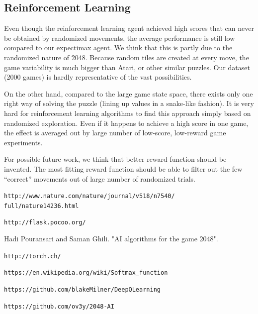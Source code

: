 \documentclass[9pt,twocolumn]{article}
\begin{document}
\subsection{Reinforcement Learning}

Even though the reinforcement learning agent achieved high scores that can never be obtained by randomized movements, the average performance is still low compared to our expectimax agent. We think that this is partly due to the randomized nature of 2048. Because random tiles are created at every move, the game variability is much bigger than Atari, or other similar puzzles. Our dataset (2000 games) is hardly representative of the vast possibilities.

On the other hand, compared to the large game state space, there exists only one right way of solving the puzzle (lining up values in a snake-like fashion). It is very hard for reinforcement learning algorithms to find this approach simply based on randomized exploration. Even if it happens to achieve a high score in one game, the effect is averaged out by large number of low-score, low-reward game experiments.

For possible future work, we think that better reward function should be invented. The most fitting reward function should be able to filter out the few “correct” movements out of large number of randomized trials.

\begin{thebibliography}{9}

 \texttt{http://www.nature.com/nature/journal/v518/n7540/\\full/nature14236.html}

 \texttt{http://flask.pocoo.org/}

 Hadi Pouransari and Saman Ghili. "AI algorithms for the game 2048".

 \texttt{http://torch.ch/}

 \texttt{https://en.wikipedia.org/wiki/Softmax\_function}

 \texttt{https://github.com/blakeMilner/DeepQLearning}

 \texttt{https://github.com/ov3y/2048-AI}

\end{thebibliography}
\end{document}
